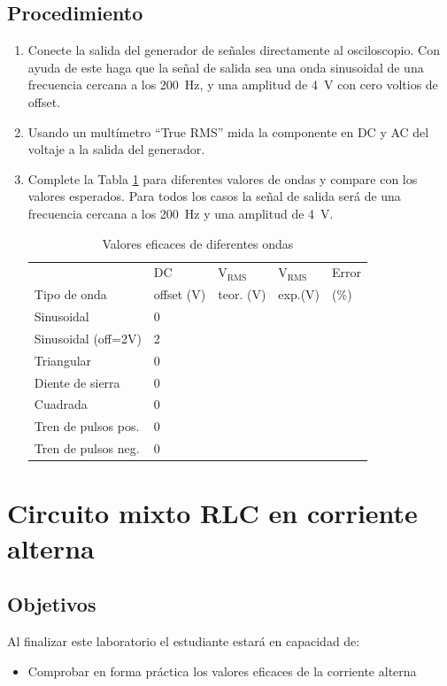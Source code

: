 \documentclass[12pt,letterpaper]{report}
\newcommand{\obj}{Objetivos}
\newcommand{\pro}{Procedimiento}
\newcommand{\capacidad}{Al finalizar este laboratorio el estudiante estará en capacidad de:}
\begin{document}
\section{\pro}
\begin{enumerate}
\item Conecte la salida del generador de señales directamente al osciloscopio. Con
ayuda de este haga que la señal de salida sea una onda sinusoidal de una frecuencia cercana a los \SI{200}{\hertz}, y una amplitud de \SI{4}{\volt} con cero voltios de offset. 
\item Usando un multímetro ``True RMS'' mida la componente en DC y AC del voltaje a la salida del generador.
\item Complete la Tabla \ref{tab:L10T1} para diferentes valores de ondas y compare con
los valores esperados. Para todos los casos la señal de salida será de una  frecuencia cercana a los \SI{200}{\hertz} y una amplitud de \SI{4}{\volt}.
\begin{table}[H]
	\caption{Valores eficaces de diferentes ondas}
	\label{tab:L10T1}
	\vspace{0.5cm}
	\centering
		\begin{tabularx}{15cm}{lXXXX}
	    \toprule
		& DC & $\mathrm{V_{RMS}}$ &$\mathrm{V_{RMS}}$ & Error\\
		Tipo de onda & offset (V) & teor. (V) & exp.(V) & (\%)\\
		\midrule
		Sinusoidal & 0 & & & \\
		Sinusoidal (off=2V) & 2 & & & \\
		Triangular & 0 & & & \\
		Diente de sierra & 0 & & & \\
		Cuadrada & 0 & & & \\
		Tren de pulsos pos. & 0 & & & \\
		Tren de pulsos neg. & 0 & & & \\
		\bottomrule
	\end{tabularx}
\end{table}

\end{enumerate}

\chapter{Circuito mixto RLC en corriente alterna}

\section{\obj}
\capacidad
\begin{itemize}
\item Comprobar en forma práctica los valores eficaces de la corriente alterna
\end{itemize}
\end{document}
